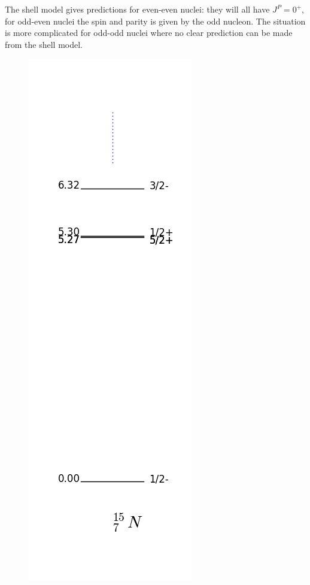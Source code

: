 \documentclass[12pt]{article}
\begin{document}
The shell model gives predictions for even-even nuclei: they will all have $J^P=0^+$, for odd-even nuclei the spin and parity is given by the odd nucleon. The situation is more complicated for odd-odd nuclei where no clear prediction can be made from the shell model.  
\begin{figure}
\begin{center}
\includegraphics[scale=0.4]{images/levels_15N.png}

\end{center}
\end{figure}
\end{document}
